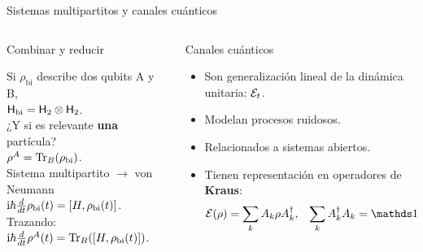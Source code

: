 \begin{frame}{Sistemas multipartitos y canales cuánticos}
    \begin{columns}
        \begin{column}{0.5\textwidth}
            \begin{block}{Combinar y reducir}
                \begin{center}
            Si $\rho_{\text{bi}}$ describe dos qubits A y B,\pause \\
            ${\sf H}_{\text{bi}}={\sf H}_{2}\otimes{\sf H}_{2}$. \pause \\
            \vspace{0.2cm}
           ¿Y si es relevante \textbf{una} partícula?\pause \\
            $\rho^{A}=\Tr_{B}(\rho_{\text{bi}})$. \pause \\
            \vspace{0.2cm} 
            Sistema multipartito $\rightarrow$ von Neumann\\
            $\text{i}\hbar\frac{d}{d t} \rho_{\text{bi}}(t)=[H,\rho_{\text{bi}}(t)]$. \pause \\
            \vspace{0.2cm}
            Trazando:\\
            $\text{i}\hbar\frac{d}{d t} \rho^{A}(t)=\Tr_{B}([H,\rho_{\text{bi}}(t)])$.\pause \\
                \end{center}
            \end{block}
        \end{column}
        \pause
        \begin{column}{0.5\textwidth}
        \begin{block}{Canales cuánticos}
            \begin{itemize}
                \item Son generalización lineal de la dinámica unitaria: $\mathcal{E}_{t}$.\pause
                \item Modelan procesos ruidosos.\pause
                \item Relacionados a sistemas abiertos.\pause
                \item Tienen representación en operadores de \textbf{Kraus}:
                    \begin{align}
                        \mcE(\rho)=\sum_{k}A_{k}\rho A^{\dagger}_{k},& &\sum_{k}A_{k}^{\dagger}A_{k}=\Id \nonumber
                    \end{align}
            \end{itemize}
        \end{block}
        \end{column}
    \end{columns}
\end{frame}



